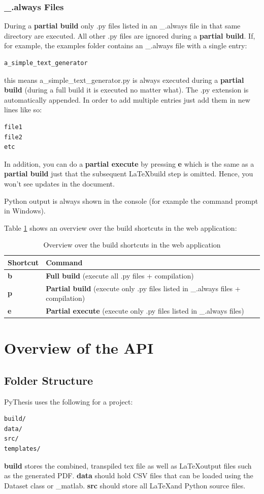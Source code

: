 \documentclass[a4paper]{book}
\begin{document}
\subsection{\_.always Files}
During a \textbf{partial build} only .py files listed in an \_.always file in that same directory are executed. All other .py files are ignored during a \textbf{partial build}. If, for example, the examples folder contains an \_.always file with a single entry: 
\begin{verbatim}
a_simple_text_generator
\end{verbatim}
this means a\_simple\_text\_generator.py is always executed during a \textbf{partial build} (during a full build it is executed no matter what). The .py extension is automatically appended. In order to add multiple entries just add them in new lines like so:
\begin{verbatim}
file1
file2
etc
\end{verbatim}
In addition, you can do a \textbf{partial execute} by pressing \textbf{e} which is the same as a \textbf{partial build} just that the subsequent \LaTeX build step is omitted. Hence, you won't see updates in the document. 

Python output is always shown in the console (for example the command prompt in Windows).

Table \ref{tab:shortcuts} shows an overview over the build shortcuts in the web application:
\begin{table}[H]
\begin{center}
\begin{tabular}{l|l}
\toprule
Shortcut & Command \\
\midrule
\textbf{b} & \textbf{Full build} (execute all .py files + compilation) \\
\textbf{p} & \textbf{Partial build} (execute only .py files listed in \_.always files + compilation) \\
\textbf{e} & \textbf{Partial execute} (execute only .py files listed in \_.always files) \\
\bottomrule
\end{tabular}
\caption{Overview over the build shortcuts in the web application}
\label{tab:shortcuts}
\end{center}
\end{table}
\chapter{Overview of the API}
\label{ch:overview-of-the-api}
\section{Folder Structure}
\label{sec:folder-structure}
PyThesis uses the following for a project:
\begin{verbatim}
build/ 
data/
src/
templates/
\end{verbatim}
\textbf{build} stores the combined, transpiled tex file as well as \LaTeX output files such as the generated PDF. \textbf{data} should hold CSV files that can be loaded using the Dataset class or \_matlab. \textbf{src} should store all \LaTeX and Python source files. \\
\end{document}
